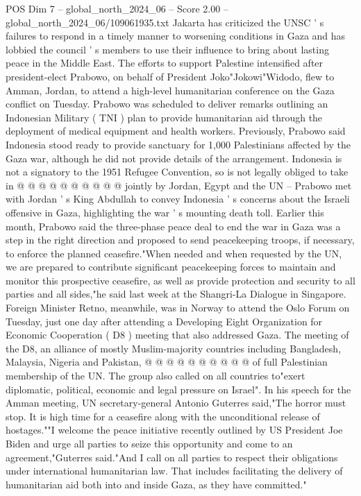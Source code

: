 \begin{textsample}{POS Dim 7 – global\_north\_2024\_06 – Score 2.00 – global\_north\_2024\_06/109061935.txt}
Jakarta has criticized the UNSC ' s failures to respond in a timely manner to worsening conditions in Gaza and has lobbied the council ' s members to use their influence to bring about lasting peace in the Middle East.
The efforts to support Palestine intensified after president-elect Prabowo, on behalf of President Joko"Jokowi"Widodo, flew to Amman, Jordan, to attend a high-level humanitarian conference on the Gaza conflict on Tuesday.
Prabowo was scheduled to deliver remarks outlining an Indonesian Military ( TNI ) plan to provide humanitarian aid through the deployment of medical equipment and health workers.
Previously, Prabowo said Indonesia stood ready to provide sanctuary for 1,000 Palestinians affected by the Gaza war, although he did not provide details of the arrangement.
Indonesia is not a signatory to the 1951 Refugee Convention, so is not legally obliged to take in @ @ @ @ @ @ @ @ @ @ jointly by Jordan, Egypt and the UN -- Prabowo met with Jordan ' s King Abdullah to convey Indonesia ' s concerns about the Israeli offensive in Gaza, highlighting the war ' s mounting death toll.
Earlier this month, Prabowo said the three-phase peace deal to end the war in Gaza was a step in the right direction and proposed to send peacekeeping troops, if necessary, to enforce the planned ceasefire."When needed and when requested by the UN, we are prepared to contribute significant peacekeeping forces to maintain and monitor this prospective ceasefire, as well as provide protection and security to all parties and all sides,"he said last week at the Shangri-La Dialogue in Singapore.
Foreign Minister Retno, meanwhile, was in Norway to attend the Oslo Forum on Tuesday, just one day after attending a Developing Eight Organization for Economic Cooperation ( D8 ) meeting that also addressed Gaza.
The meeting of the D8, an alliance of mostly Muslim-majority countries including Bangladesh, Malaysia, Nigeria and Pakistan, @ @ @ @ @ @ @ @ @ @ of full Palestinian membership of the UN.
The group also called on all countries to"exert diplomatic, political, economic and legal pressure on Israel".
In his speech for the Amman meeting, UN secretary-general Antonio Guterres said,"The horror must stop.
It is high time for a ceasefire along with the unconditional release of hostages.""I welcome the peace initiative recently outlined by US President Joe Biden and urge all parties to seize this opportunity and come to an agreement,"Guterres said."And I call on all parties to respect their obligations under international humanitarian law.
That includes facilitating the delivery of humanitarian aid both into and inside Gaza, as they have committed."

\end{textsample}
